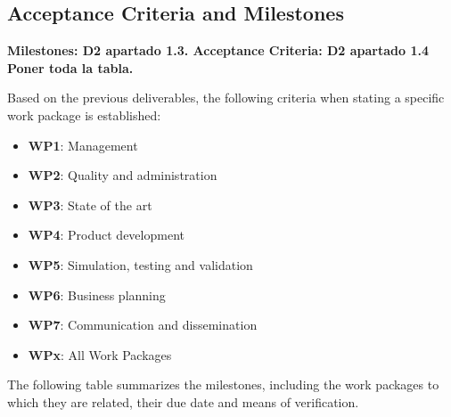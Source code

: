 \subsection{Acceptance Criteria and Milestones}

\textbf{Milestones: D2 apartado 1.3. Acceptance Criteria: D2 apartado 1.4 Poner toda la tabla.}

Based on the previous deliverables, the following criteria when stating a specific work package is established:
\begin{itemize} 	
	\item \textbf{WP1}: Management 
	\item \textbf{WP2}: Quality and administration
	\item \textbf{WP3}: State of the art
	\item \textbf{WP4}: Product development
	\item \textbf{WP5}: Simulation, testing and validation
	\item \textbf{WP6}: Business planning
	\item \textbf{WP7}: Communication and dissemination
	\item \textbf{WPx}: All Work Packages
\end{itemize}

The following table summarizes the milestones, including the work packages to which they are related, their due date and means of verification.

